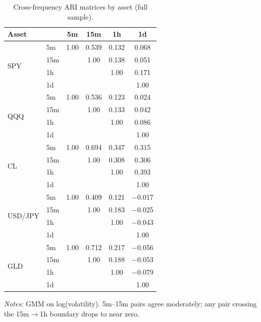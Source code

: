 \documentclass[preprint,12pt,authoryear]{elsarticle}
\newcommand{\SPY}{SPY}
\newcommand{\CL}{CL}
\newcommand{\USDJPY}{USD/JPY}
\newcommand{\GLD}{GLD}
\begin{document}
\begin{table}[!htbp]
\centering
\small
\setlength{\tabcolsep}{4pt}
\caption{Cross-frequency ARI matrices by asset (full sample).}
\label{tab:ari_matrix_combined}
\begin{tabular}{llcccc}
\toprule
Asset & & 5m & 15m & 1h & 1d \\
\midrule
\multirow{4}{*}{\SPY{}}
 & 5m  & 1.00 & 0.539 & 0.132 & 0.068 \\
 & 15m &      & 1.00 & 0.138 & 0.051 \\
 & 1h  &      &      & 1.00 & 0.171 \\
 & 1d  &      &      &      & 1.00 \\
\midrule
\multirow{4}{*}{QQQ}
 & 5m  & 1.00 & 0.536 & 0.123 & 0.024 \\
 & 15m &      & 1.00 & 0.133 & 0.042 \\
 & 1h  &      &      & 1.00 & 0.086 \\
 & 1d  &      &      &      & 1.00 \\
\midrule
\multirow{4}{*}{\CL{}}
 & 5m  & 1.00 & 0.694 & 0.347 & 0.315 \\
 & 15m &      & 1.00 & 0.308 & 0.306 \\
 & 1h  &      &      & 1.00 & 0.393 \\
 & 1d  &      &      &      & 1.00 \\
\midrule
\multirow{4}{*}{\USDJPY{}}
 & 5m  & 1.00 & 0.409 & 0.121 & $-$0.017 \\
 & 15m &      & 1.00 & 0.183 & $-$0.025 \\
 & 1h  &      &      & 1.00 & $-$0.043 \\
 & 1d  &      &      &      & 1.00 \\
\midrule
\multirow{4}{*}{\GLD{}}
 & 5m  & 1.00 & 0.712 & 0.217 & $-$0.056 \\
 & 15m &      & 1.00 & 0.188 & $-$0.053 \\
 & 1h  &      &      & 1.00 & $-$0.079 \\
 & 1d  &      &      &      & 1.00 \\
\bottomrule
\end{tabular}
\par\medskip
{\footnotesize\justifying
\textit{Notes:} GMM on log(volatility). 5m--15m pairs agree moderately; any pair crossing the 15m$\to$1h boundary drops to near zero.
\par}
\end{table}
\end{document}

